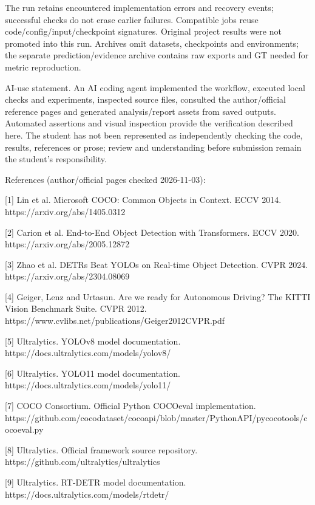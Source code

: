 \documentclass[10pt]{article}
\begin{document}
The run retains encountered implementation errors and recovery events; successful checks do not erase earlier failures. Compatible jobs reuse code/config/input/checkpoint signatures. Original project results were not promoted into this run. Archives omit datasets, checkpoints and environments; the separate prediction/evidence archive contains raw exports and GT needed for metric reproduction.


AI-use statement. An AI coding agent implemented the workflow, executed local checks and experiments, inspected source files, consulted the author/official reference pages and generated analysis/report assets from saved outputs. Automated assertions and visual inspection provide the verification described here. The student has not been represented as independently checking the code, results, references or prose; review and understanding before submission remain the student’s responsibility.


References (author/official pages checked 2026-11-03):


[1] Lin et al. Microsoft COCO: Common Objects in Context. ECCV 2014. https://arxiv.org/abs/1405.0312


[2] Carion et al. End-to-End Object Detection with Transformers. ECCV 2020. https://arxiv.org/abs/2005.12872


[3] Zhao et al. DETRs Beat YOLOs on Real-time Object Detection. CVPR 2024. https://arxiv.org/abs/2304.08069


[4] Geiger, Lenz and Urtasun. Are we ready for Autonomous Driving? The KITTI Vision Benchmark Suite. CVPR 2012. https://www.cvlibs.net/publications/Geiger2012CVPR.pdf


[5] Ultralytics. YOLOv8 model documentation. https://docs.ultralytics.com/models/yolov8/


[6] Ultralytics. YOLO11 model documentation. https://docs.ultralytics.com/models/yolo11/


[7] COCO Consortium. Official Python COCOeval implementation. https://github.com/cocodataset/cocoapi/blob/master/PythonAPI/pycocotools/cocoeval.py


[8] Ultralytics. Official framework source repository. https://github.com/ultralytics/ultralytics


[9] Ultralytics. RT-DETR model documentation. https://docs.ultralytics.com/models/rtdetr/
\end{document}
